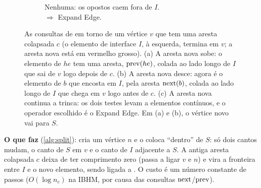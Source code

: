 \begin{figure}[ht]
\begin{subfigure}[b]{0.325\linewidth}
\caption{Nenhuma: os opostos caem fora de $I$.\\ $\Rightarrow$ Expand Edge.}
\end{subfigure}
\caption{As consultas de  em torno de um vértice $v$ que tem uma aresta colapsada $c$ (o
elemento de interface $I$, à esquerda, termina em $v$; a aresta nova está em vermelho grosso). (a) A aresta nova sobe:
o elemento de $he$ tem uma aresta, $\mathrm{prev}(he)$, colada ao lado longo de $I$ que sai de $v$ logo depois de $c$. (b) A
aresta nova desce: agora é o elemento de $b$ que encosta em $I$, pela aresta $\mathrm{next}(b)$, colada ao lado longo de $I$ que
chega em $v$ logo antes de $c$. (c) A aresta nova continua a trinca: os dois testes levam a elementos contínuos, e o
operador escolhido é o Expand Edge. Em (a) e (b), o vértice novo vai para $S$.}
\label{fig:hipoteses}
\end{figure}

\textbf{O que faz} (\cref{alg:split}): cria um vértice $n$ e o coloca ``dentro'' de $S$: só dois cantos mudam, o canto de
$S$ em $v$ e o canto de $I$ adjacente a $S$. A antiga aresta colapsada $c$ deixa de ter comprimento zero (passa a ligar
$v$ e $n$) e vira a fronteira entre $I$ e o novo elemento, sendo ligada a . O custo é um número
constante de passos ($O(\log n_c)$ na IBHM, por causa das consultas $\mathrm{next}$/$\mathrm{prev}$).

